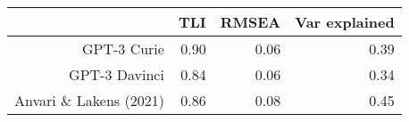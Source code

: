 \begin{table}[ht]
\centering
\begin{tabular}{rrrr}
  \hline
 & TLI & RMSEA & Var explained \\ 
  \hline
GPT-3 Curie & 0.90 & 0.06 & 0.39 \\ 
  GPT-3 Davinci & 0.84 & 0.06 & 0.34 \\ 
  Anvari \& Lakens (2021) & 0.86 & 0.08 & 0.45 \\ 
   \hline
\end{tabular}
\end{table}
